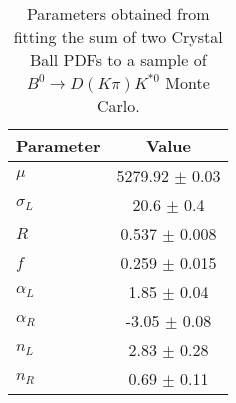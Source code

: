 \begin{table}[h]
  \centering
  \begin{tabular}{lc}
      \toprule
      Parameter & Value \\
      \midrule
      $\mu$ & 5279.92 $\pm$ 0.03 \\
      $\sigma_L$ & 20.6 $\pm$ 0.4 \\
      $R$ & 0.537 $\pm$ 0.008 \\
      $f$ & 0.259 $\pm$ 0.015 \\
      $\alpha_L$ & 1.85 $\pm$ 0.04 \\
      $\alpha_R$ & -3.05 $\pm$ 0.08 \\
      $n_L$ & 2.83 $\pm$ 0.28 \\
      $n_R$ & 0.69 $\pm$ 0.11 \\
  \bottomrule
  \end{tabular}
  \caption{Parameters obtained from fitting the sum of two Crystal Ball PDFs to a sample of $B^0 \to D(K\pi)K^{*0}$ Monte Carlo.}
\label{tab:signal_Kpi_MC_params}
\end{table}
